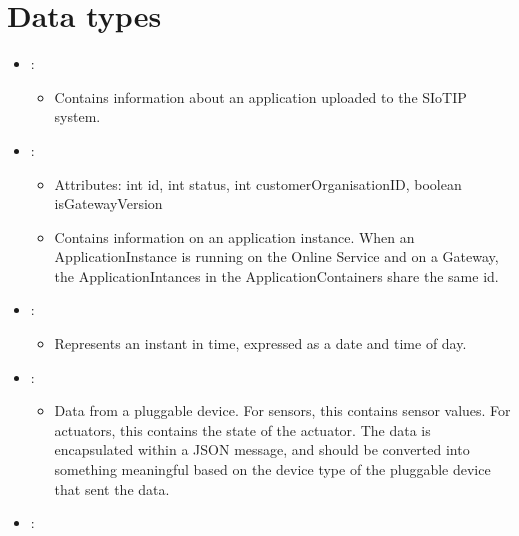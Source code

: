 \section{Data types}\label{sec:datatypes}
\begin{itemize}[nolistsep,noitemsep]
\item {}: 
\begin{itemize}[noitemsep,nolistsep]

\item[] Contains information about an application uploaded to the SIoTIP system.
\end{itemize}
\item {}: 
\begin{itemize}[noitemsep,nolistsep]
\item[] Attributes: int id, int status, int customerOrganisationID, boolean isGatewayVersion
\item[] Contains information on an application instance.
When an ApplicationInstance is running on the Online Service and on a Gateway, the ApplicationIntances in the ApplicationContainers share the same id.
\end{itemize}
\item {}: 
\begin{itemize}[noitemsep,nolistsep]

\item[] Represents an instant in time, expressed as a date and time of day.
\end{itemize}
\item {}: 
\begin{itemize}[noitemsep,nolistsep]

\item[] Data from a pluggable device. For sensors, this contains sensor values. For actuators, this contains the state of the actuator. The data is encapsulated within a JSON message, and should be converted into something meaningful based on the device type of the pluggable device that sent the data.
\end{itemize}
\item {}: 
\begin{itemize}


\end{itemize}
\end{itemize}

